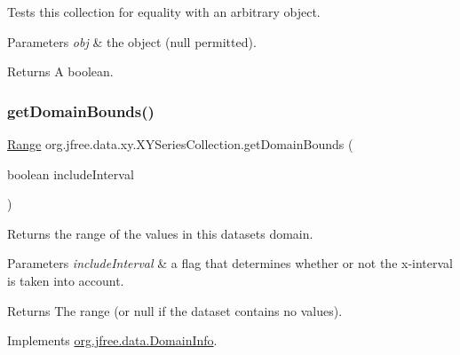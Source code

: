 Tests this collection for equality with an arbitrary object.


\begin{DoxyParams}{Parameters}
{\em obj} & the object ({\ttfamily null} permitted).\\
\hline
\end{DoxyParams}
\begin{DoxyReturn}{Returns}
A boolean. 
\end{DoxyReturn}
\mbox{\label{classorg_1_1jfree_1_1data_1_1xy_1_1_x_y_series_collection_a21ae9645c6f9ed82cdd4f358da48d62b}} 
\subsubsection{\texorpdfstring{get\+Domain\+Bounds()}{getDomainBounds()}}
{\footnotesize\ttfamily \mbox{\hyperlink{classorg_1_1jfree_1_1data_1_1_range}{Range}} org.\+jfree.\+data.\+xy.\+X\+Y\+Series\+Collection.\+get\+Domain\+Bounds (\begin{DoxyParamCaption}\item[{boolean}]{include\+Interval }\end{DoxyParamCaption})}

Returns the range of the values in this dataset\textquotesingle{}s domain.


\begin{DoxyParams}{Parameters}
{\em include\+Interval} & a flag that determines whether or not the x-\/interval is taken into account.\\
\hline
\end{DoxyParams}
\begin{DoxyReturn}{Returns}
The range (or {\ttfamily null} if the dataset contains no values). 
\end{DoxyReturn}


Implements \mbox{\hyperlink{interfaceorg_1_1jfree_1_1data_1_1_domain_info_aeb90c8bc6d27c82c39abc99622846732}{org.\+jfree.\+data.\+Domain\+Info}}.

\mbox{\label{classorg_1_1jfree_1_1data_1_1xy_1_1_x_y_series_collection_a4830b1dd51af2617e8a5bf80fdcf9aee}} 
